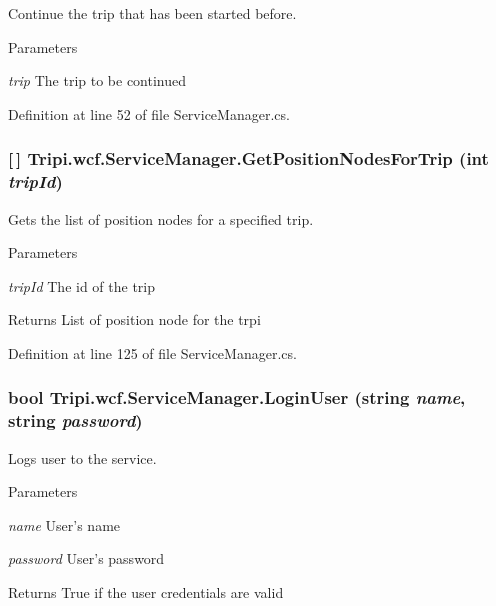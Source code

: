 Continue the trip that has been started before. 
\begin{DoxyParams}{Parameters}
\item[{\em trip}]The trip to be continued\end{DoxyParams}


Definition at line 52 of file ServiceManager.cs.\hypertarget{class_tripi_1_1wcf_1_1_service_manager_a45d966e10a20b29bb2816e96f9749988}{
\subsubsection[{GetPositionNodesForTrip}]{ \mbox{[}$\,$\mbox{]} Tripi.wcf.ServiceManager.GetPositionNodesForTrip (int {\em tripId})}}
\label{class_tripi_1_1wcf_1_1_service_manager_a45d966e10a20b29bb2816e96f9749988}


Gets the list of position nodes for a specified trip. 
\begin{DoxyParams}{Parameters}
\item[{\em tripId}]The id of the trip\end{DoxyParams}
\begin{DoxyReturn}{Returns}
List of position node for the trpi
\end{DoxyReturn}


Definition at line 125 of file ServiceManager.cs.\hypertarget{class_tripi_1_1wcf_1_1_service_manager_a49ddf47f12c142164c1390eb247bbf70}{
\subsubsection[{LoginUser}]{\setlength{\rightskip}{0pt plus 5cm}bool Tripi.wcf.ServiceManager.LoginUser (string {\em name}, \/  string {\em password})}}
\label{class_tripi_1_1wcf_1_1_service_manager_a49ddf47f12c142164c1390eb247bbf70}


Logs user to the service. 
\begin{DoxyParams}{Parameters}
\item[{\em name}]User's name\item[{\em password}]User's password\end{DoxyParams}
\begin{DoxyReturn}{Returns}
True if the user credentials are valid
\end{DoxyReturn}



